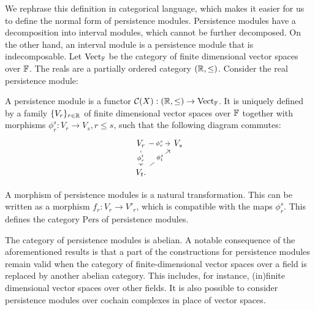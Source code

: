 We rephrase this definition in categorical language, which makes it easier for us to define the normal form of persistence modules. Persistence modules have a decomposition into interval modules, which cannot be further decomposed. On the other hand, an interval module is a persistence module that is indecomposable. Let $\operatorname{Vect}_{\mathbb{F}}$ be the category of finite dimensional vector spaces over ${\mathbb{F}}$. The reals are a partially ordered category $({\mathbb{R}}, \leq)$. Consider the real persistence module:

\begin{definition}{\cite[\S 1.3]{chazal2016structure}}
A persistence module is a functor $\mathcal{C}(X): ({\mathbb{R}},\leq) \rightarrow \operatorname{Vect}_{\mathbb{F}}$. It is uniquely defined by a family $\{V_r\}_{r\in{\mathbb{R}}}$ of finite dimensional vector spaces over ${\mathbb{F}}$ together with morphisms $\phi_{r}^{s}: V_r \rightarrow V_s, r \leq s$, such that the following diagram commutes:
\begin{equation}
\begin{tikzcd}
V_r \arrow[d, "{\phi_{r}^{t}}" description] \arrow[r, "{\phi_{r}^{s}}" description] & V_s \\
V_t. \arrow[ru, "{\phi_{t}^{s}}" description]                                      &    
\end{tikzcd}
\end{equation}
\end{definition}

\begin{remark}
A morphism of persistence modules is a natural transformation. This can be written as a morphism $f_r: V_r \rightarrow V'_r$, which is compatible with the maps $\phi_{r}^{s}$. This defines the category $\mathrm{Pers}$ of persistence modules.
\end{remark}

The category of persistence modules is abelian. A notable consequence of the aforementioned results is that a part of the constructions for persistence modules remain valid when the category of finite-dimensional vector spaces over a field is replaced by another abelian category. This includes, for instance, (in)finite dimensional vector spaces over other fields. It is also possible to consider persistence modules over cochain complexes in place of vector spaces.

